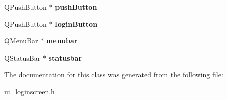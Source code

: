 \begin{DoxyCompactItemize}
Q\+Push\+Button $\ast$ {\bfseries push\+Button}
\item 
\mbox{\label{class_ui___login_screen_afdae720dc03ff1676db9f1ccf399db73}} 
Q\+Push\+Button $\ast$ {\bfseries login\+Button}
\item 
\mbox{\label{class_ui___login_screen_a202e5d280c74f83c73128f2baaabbbd4}} 
Q\+Menu\+Bar $\ast$ {\bfseries menubar}
\item 
\mbox{\label{class_ui___login_screen_abf4c2a355b73009684a94574f58db42b}} 
Q\+Status\+Bar $\ast$ {\bfseries statusbar}
\end{DoxyCompactItemize}


The documentation for this class was generated from the following file\+:\begin{DoxyCompactItemize}
\item 
ui\+\_\+loginscreen.\+h\end{DoxyCompactItemize}
